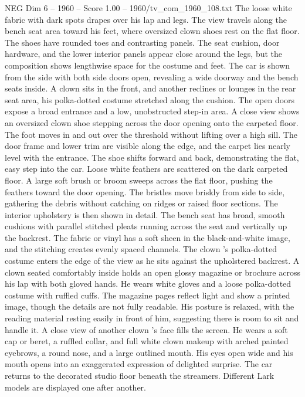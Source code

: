 \begin{textsample}{NEG Dim 6 – 1960 – Score 1.00 – 1960/tv\_com\_1960\_108.txt}
The loose white fabric with dark spots drapes over his lap and legs.
The view travels along the bench seat area toward his feet, where oversized clown shoes rest on the flat floor.
The shoes have rounded toes and contrasting panels.
The seat cushion, door hardware, and the lower interior panels appear close around the legs, but the composition shows lengthwise space for the costume and feet.
The car is shown from the side with both side doors open, revealing a wide doorway and the bench seats inside.
A clown sits in the front, and another reclines or lounges in the rear seat area, his polka-dotted costume stretched along the cushion.
The open doors expose a broad entrance and a low, unobstructed step-in area.
A close view shows an oversized clown shoe stepping across the door opening onto the carpeted floor.
The foot moves in and out over the threshold without lifting over a high sill.
The door frame and lower trim are visible along the edge, and the carpet lies nearly level with the entrance.
The shoe shifts forward and back, demonstrating the flat, easy step into the car.
Loose white feathers are scattered on the dark carpeted floor.
A large soft brush or broom sweeps across the flat floor, pushing the feathers toward the door opening.
The bristles move briskly from side to side, gathering the debris without catching on ridges or raised floor sections.
The interior upholstery is then shown in detail.
The bench seat has broad, smooth cushions with parallel stitched pleats running across the seat and vertically up the backrest.
The fabric or vinyl has a soft sheen in the black-and-white image, and the stitching creates evenly spaced channels.
The clown ’s polka-dotted costume enters the edge of the view as he sits against the upholstered backrest.
A clown seated comfortably inside holds an open glossy magazine or brochure across his lap with both gloved hands.
He wears white gloves and a loose polka-dotted costume with ruffled cuffs.
The magazine pages reflect light and show a printed image, though the details are not fully readable.
His posture is relaxed, with the reading material resting easily in front of him, suggesting there is room to sit and handle it.
A close view of another clown ’s face fills the screen.
He wears a soft cap or beret, a ruffled collar, and full white clown makeup with arched painted eyebrows, a round nose, and a large outlined mouth.
His eyes open wide and his mouth opens into an exaggerated expression of delighted surprise.
The car returns to the decorated studio floor beneath the streamers.
Different Lark models are displayed one after another.

\end{textsample}
